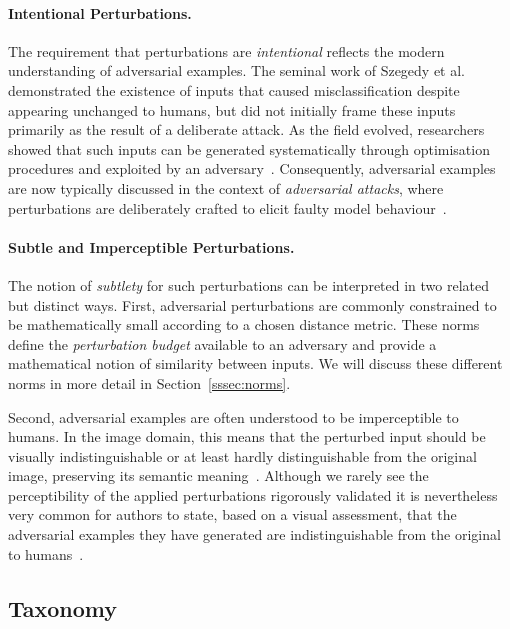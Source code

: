 \documentclass[review]{AIM_report}
\begin{document}
\paragraph{Intentional Perturbations.}
The requirement that perturbations are \textit{intentional} reflects the modern understanding of adversarial examples. The seminal work of Szegedy et al. \cite{szegedy2013intriguing} demonstrated the existence of inputs that caused misclassification despite appearing unchanged to humans, but did not initially frame these inputs primarily as the result of a deliberate attack. As the field evolved, researchers showed that such inputs can be generated systematically through optimisation procedures and exploited by an adversary~\cite{moosavi2016deepfool, madry2017towards}. Consequently, adversarial examples are now typically discussed in the context of \textit{adversarial attacks}, where perturbations are deliberately crafted to elicit faulty model behaviour~\cite{chakraborty2018adversarial, pitropakis2019taxonomy, costa2024deep}.

\paragraph{Subtle and Imperceptible Perturbations.}
The notion of \textit{subtlety} for such perturbations can be interpreted in two related but distinct ways. First, adversarial perturbations are commonly constrained to be mathematically small according to a chosen distance metric. These norms define the \textit{perturbation budget} available to an adversary and provide a mathematical notion of similarity between inputs. We will discuss these different norms in more detail in Section~\ref{sssec:norms}.

Second, adversarial examples are often understood to be imperceptible to humans. In the image domain, this means that the perturbed input should be visually indistinguishable or at least hardly distinguishable from the original image, preserving its semantic meaning~\cite{madry2017towards,moosavi2016deepfool}. Although we rarely see the perceptibility of the applied perturbations rigorously validated it is nevertheless very common for authors to state, based on a visual assessment, that the adversarial examples they have generated are indistinguishable from the original to humans~\cite{brendel2017decision, chakraborty2018adversarial, costa2024deep, liang2022adversarial, papernot2016distillation, papernot2016transferability}.

\subsection{Taxonomy}
\label{sec:taxonomy}
\end{document}
